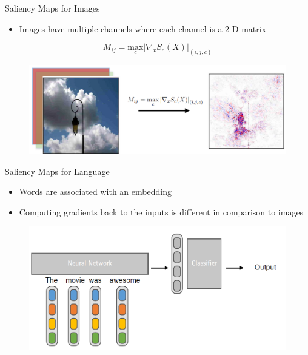 \documentclass[11pt,compress,t,notes=noshow, aspectratio=169, xcolor=table]{beamer}
\begin{document}
\begin{frame}{Saliency Maps for Images}
    \begin{itemize}
        \item Images have multiple channels where each channel is a 2-D matrix
    \end{itemize}
    \begin{equation*}
        M_{ij} = \underset{c}{\text{max}}\left|\nabla_xS_c(X) \right|_{(i,j,c)}
    \end{equation*}
    \begin{figure}
        \centering
        \includegraphics[scale=.45]{bild16n}
    \end{figure}
\end{frame}

\begin{frame}{Saliency Maps for Language}
    \begin{itemize}
        \item Words are associated with an embedding
        \item Computing gradients back to the inputs is different in comparison to images
    \end{itemize}
    \begin{figure}
        \centering
        \includegraphics[scale=.4]{bild17}
    \end{figure}
\end{frame}
\end{document}
